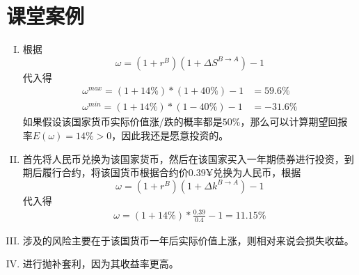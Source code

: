 \documentclass[UTF8]{ctexart}
\begin{document}
    \section{课堂案例}
    \begin{enumerate}[I.]
        \item 根据$$\omega = (1+r^B)(1+\Delta S^{B\rightarrow A}) - 1$$ 代入得
        \begin{align}
            \omega^{max} = (1 + 14\%)*(1+40\%) - 1 &= 59.6\%\\
            \omega^{min} = (1 + 14\%)*(1-40\%) - 1 &= -31.6\%
        \end{align}
        如果假设该国家货币实际价值涨/跌的概率都是$50\%$，那么可以计算期望回报率$E(\omega) = 14\% > 0$，因此我还是愿意投资的。
        \item 首先将人民币兑换为该国家货币，然后在该国家买入一年期债券进行投资，到期后履行合约，将该国货币根据合约价$0.39¥$兑换为人民币，根据$$\omega = (1+r^B)(1+\Delta k^{B\rightarrow A}) - 1$$ 代入得\begin{align}
            \omega = (1+14\%)*\frac{0.39}{0.4}-1 = 11.15\%
        \end{align}
        \item 涉及的风险主要在于该国货币一年后实际价值上涨，则相对来说会损失收益。
        \item 进行抛补套利，因为其收益率更高。
    \end{enumerate}
    
\end{document}
